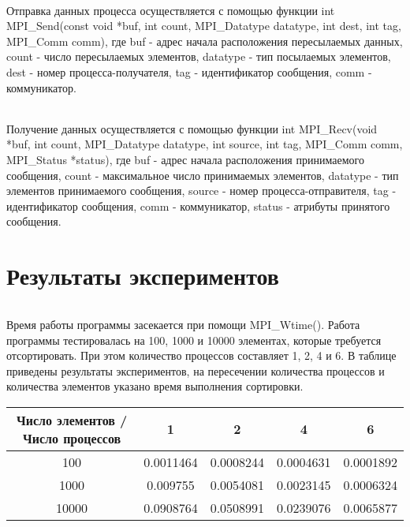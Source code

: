 \documentclass[12pt,a4paper]{article}
\begin{document}
\paragraph{}Отправка данных процесса осуществляется с помощью функции int MPI\_Send(const void *buf, int count, MPI\_Datatype datatype, int dest, int tag, MPI\_Comm comm), где buf	-	адрес начала расположения пересылаемых данных, count	-	число пересылаемых элементов, datatype	-	тип посылаемых элементов, dest	-	номер процесса-получателя, tag	-	идентификатор сообщения, comm	-	коммуникатор.
\paragraph{}Получение данных осуществляется с помощью функции int MPI\_Recv(void *buf, int count, MPI\_Datatype datatype, int source, int tag, MPI\_Comm comm, MPI\_Status *status), где buf	-	адрес начала расположения принимаемого сообщения, count	-	максимальное число принимаемых элементов, datatype	-	тип элементов принимаемого сообщения, source	-	номер процесса-отправителя, tag	-	идентификатор сообщения, comm	-	коммуникатор, status	-	атрибуты принятого сообщения. 

\part*{Результаты экспериментов}
\paragraph{}Время работы программы засекается при помощи MPI\_Wtime(). Работа программы тестировалась на 100, 1000 и 10000 элементах, которые требуется отсортировать. При этом количество процессов составляет 1, 2, 4 и 6. В таблице приведены результаты экспериментов, на пересечении количества процессов и количества элементов указано время выполнения сортировки.
\begin{center}
\begin{tabular}{||c c c c c ||} 
 \hline
 Число элементов / Число процессов & 1 & 2 & 4 & 6 \\ [0.5ex] 
 \hline\hline
 100 & 0.0011464 & 0.0008244 & 0.0004631 & 0.0001892\\ 
 \hline
 1000 & 0.009755 & 0.0054081 & 0.0023145 & 0.0006324 \\
 \hline
 10000 & 0.0908764 & 0.0508991 & 0.0239076 & 0.0065877 \\
[1ex] 
 \hline
\end{tabular}
\end{center}
\end{document}
